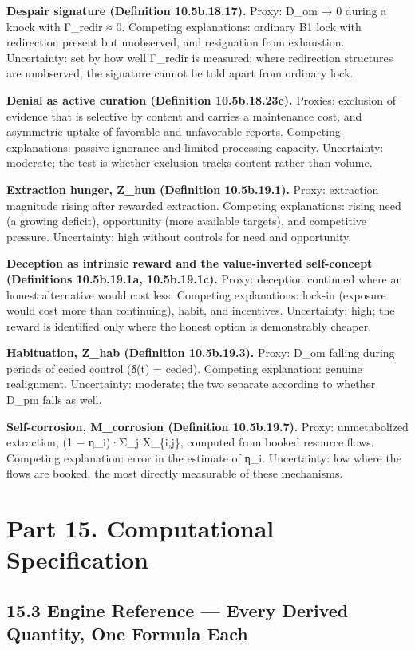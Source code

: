 \documentclass[
]{article}
\begin{document}
\textbf{Despair signature (Definition 10.5b.18.17).} Proxy: D\_om → 0
during a knock with Γ\_redir ≈ 0. Competing explanations: ordinary B1
lock with redirection present but unobserved, and resignation from
exhaustion. Uncertainty: set by how well Γ\_redir is measured; where
redirection structures are unobserved, the signature cannot be told
apart from ordinary lock.

\textbf{Denial as active curation (Definition 10.5b.18.23c).} Proxies:
exclusion of evidence that is selective by content and carries a
maintenance cost, and asymmetric uptake of favorable and unfavorable
reports. Competing explanations: passive ignorance and limited
processing capacity. Uncertainty: moderate; the test is whether
exclusion tracks content rather than volume.

\textbf{Extraction hunger, Z\_hun (Definition 10.5b.19.1).} Proxy:
extraction magnitude rising after rewarded extraction. Competing
explanations: rising need (a growing deficit), opportunity (more
available targets), and competitive pressure. Uncertainty: high without
controls for need and opportunity.

\textbf{Deception as intrinsic reward and the value-inverted
self-concept (Definitions 10.5b.19.1a, 10.5b.19.1c).} Proxy: deception
continued where an honest alternative would cost less. Competing
explanations: lock-in (exposure would cost more than continuing), habit,
and incentives. Uncertainty: high; the reward is identified only where
the honest option is demonstrably cheaper.

\textbf{Habituation, Z\_hab (Definition 10.5b.19.3).} Proxy: D\_om
falling during periods of ceded control (δ(t) = ceded). Competing
explanation: genuine realignment. Uncertainty: moderate; the two
separate according to whether D\_pm falls as well.

\textbf{Self-corrosion, M\_corrosion (Definition 10.5b.19.7).} Proxy:
unmetabolized extraction, (1 − η\_i)·Σ\_j X\_\{i,j\}, computed from
booked resource flows. Competing explanation: error in the estimate of
η\_i. Uncertainty: low where the flows are booked, the most directly
measurable of these mechanisms.

\hypertarget{part-15.-computational-specification}{%
\section{Part 15. Computational
Specification}\label{part-15.-computational-specification}}

\hypertarget{engine-reference-every-derived-quantity-one-formula-each}{%
\subsection{15.3 Engine Reference --- Every Derived Quantity, One
Formula
Each}\label{engine-reference-every-derived-quantity-one-formula-each}}
\end{document}
